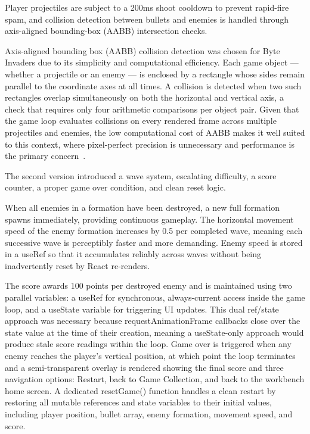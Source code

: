 \documentclass[a4paper,12pt]{article}
\begin{document}
Player projectiles are subject to a 200ms shoot cooldown to prevent rapid-fire spam, and collision detection between bullets and enemies is handled through axis-aligned bounding-box (AABB) intersection checks.

\begin{notebox}
Axis-aligned bounding box (AABB) collision detection was chosen for 
Byte Invaders due to its simplicity and computational efficiency. Each 
game object — whether a projectile or an enemy — is enclosed by a 
rectangle whose sides remain parallel to the coordinate axes at all 
times. A collision is detected when two such rectangles overlap 
simultaneously on both the horizontal and vertical axis, a check that 
requires only four arithmetic comparisons per object pair. Given that 
the game loop evaluates collisions on every rendered frame across 
multiple projectiles and enemies, the low computational cost of AABB 
makes it well suited to this context, where pixel-perfect precision 
is unnecessary and performance is the primary concern~\cite{aabb}.
\end{notebox}

The second version introduced a wave system, escalating difficulty, a score counter, a proper game over condition, and clean reset logic. 

When all enemies in a formation have been destroyed, a new full formation spawns immediately, providing continuous gameplay. The horizontal movement speed of the enemy formation increases by 0.5 per completed wave, meaning each successive wave is perceptibly faster and more demanding. Enemy speed is stored in a useRef so that it accumulates reliably across waves without being inadvertently reset by React re-renders. 

The score awards 100 points per destroyed enemy and is maintained using two parallel variables: a useRef for synchronous, always-current access inside the game loop, and a useState variable for triggering UI updates. This dual ref/state approach was necessary because requestAnimationFrame callbacks close over the state value at the time of their creation, meaning a useState-only approach would produce stale score readings within the loop. 
\newpage
Game over is triggered when any enemy reaches the player's vertical position, at which point the loop terminates and a semi-transparent overlay is rendered showing the final score and three navigation options: Restart, back to Game Collection, and back to the workbench home screen. A dedicated resetGame() function handles a clean restart by restoring all mutable references and state variables to their initial values, including player position, bullet array, enemy formation, movement speed, and score.
\end{document}
